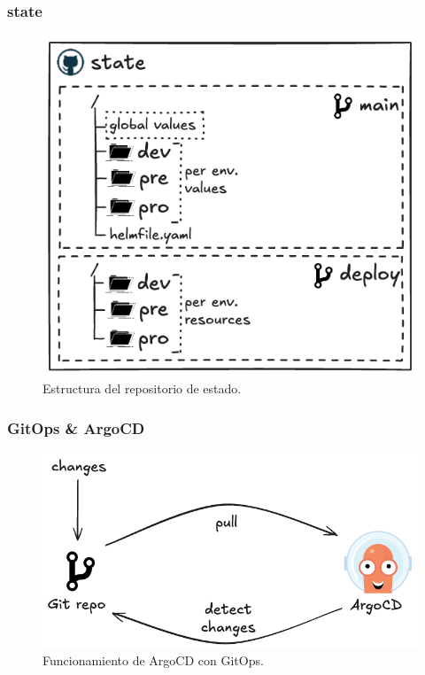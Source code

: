 \documentclass{beamer}
\begin{document}
\begin{frame}
    \frametitle{state}
    \begin{figure}
        \includegraphics[scale=0.3]{figuras/state}
        \caption{Estructura del repositorio de estado.}
    \end{figure}
\end{frame}

\begin{frame}
    \frametitle{GitOps \& ArgoCD}
    \begin{figure}
        \includegraphics[scale=0.35]{figuras/argocd-simple}
        \caption{Funcionamiento de ArgoCD con GitOps.}
    \end{figure}
\end{frame}
\end{document}
